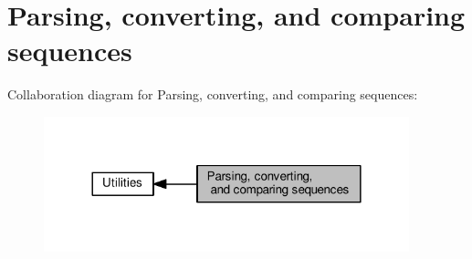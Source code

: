 \hypertarget{group__string__utils}{}\section{Parsing, converting, and comparing sequences}
\label{group__string__utils}
Collaboration diagram for Parsing, converting, and comparing sequences\+:
\nopagebreak
\begin{figure}[H]
\begin{center}
\leavevmode
\includegraphics[width=300pt]{group__string__utils}
\end{center}
\end{figure}
